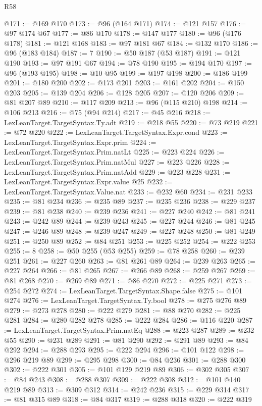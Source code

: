 \begin{lexlean}{R58}
\begin{coremodule}
@171 := @169 @170
@173 := @96 (@164 @171)
@174 := @121 @157
@176 := @97 @174 @67
@177 := @86 @170
@178 := @147 @177
@180 := @96 (@176 @178)
@181 := @121 @168
@183 := @97 @181 @67
@184 := @132 @170
@186 := @96 (@183 @184)
@187 := 7
@190 := @50 @187 (@53 @187)
@191 := @121 @190
@193 := @97 @191 @67
@194 := @78 @190
@195 := @194 @170
@197 := @96 (@193 @195)
@198 := @10 @95
@199 := @197 @198
@200 := @186 @199
@201 := @180 @200
@202 := @173 @201
@203 := @161 @202
@204 := @150 @203
@205 := @139 @204
@206 := @128 @205
@207 := @120 @206
@209 := @81 @207 @89
@210 := @117 @209
@213 := @96 (@115 @210) @198
@214 := @106 @213
@216 := @75 (@94 @214)
@217 := @45 @216
@218 := LexLeanTarget.TargetSyntax.Ty.adt
@219 := @218 @55
@220 := @73 @219
@221 := @72 @220
@222 := LexLeanTarget.TargetSyntax.Expr.cond
@223 := LexLeanTarget.TargetSyntax.Expr.prim
@224 := LexLeanTarget.TargetSyntax.Prim.natLt
@225 := @223 @224
@226 := LexLeanTarget.TargetSyntax.Prim.natMul
@227 := @223 @226
@228 := LexLeanTarget.TargetSyntax.Prim.natAdd
@229 := @223 @228
@231 := LexLeanTarget.TargetSyntax.Expr.value @25
@232 := LexLeanTarget.TargetSyntax.Value.nat
@233 := @232 @60
@234 := @231 @233
@235 := @81 @234
@236 := @235 @89
@237 := @235 @236
@238 := @229 @237
@239 := @81 @238
@240 := @239 @236
@241 := @227 @240
@242 := @81 @241
@243 := @242 @89
@244 := @239 @243
@245 := @227 @244
@246 := @81 @245
@247 := @246 @89
@248 := @239 @247
@249 := @227 @248
@250 := @81 @249
@251 := @250 @89
@252 := @84 @251
@253 := @225 @252
@254 := @222 @253
@255 := 8
@258 := @50 @255 (@53 @255)
@259 := @78 @258
@260 := @239 @251
@261 := @227 @260
@263 := @81 @261 @89
@264 := @239 @263
@265 := @227 @264
@266 := @81 @265
@267 := @266 @89
@268 := @259 @267
@269 := @81 @268
@270 := @269 @89
@271 := @86 @270
@272 := @225 @271
@273 := @254 @272
@274 := LexLeanTarget.TargetSyntax.Shape.false
@275 := @101 @274
@276 := LexLeanTarget.TargetSyntax.Ty.bool
@278 := @275 @276 @89
@279 := @273 @278
@280 := @222 @279
@281 := @88 @270
@282 := @225 @281
@284 := @280 @282 @278
@285 := @222 @284
@286 := @116 @220
@287 := LexLeanTarget.TargetSyntax.Prim.natEq
@288 := @223 @287
@289 := @232 @55
@290 := @231 @289
@291 := @81 @290
@292 := @291 @89
@293 := @84 @292
@294 := @288 @293
@295 := @222 @294
@296 := @101 @122
@298 := @296 @219 @89
@299 := @295 @298
@300 := @84 @236
@301 := @288 @300
@302 := @222 @301
@305 := @101 @129 @219 @89
@306 := @302 @305
@307 := @84 @243
@308 := @288 @307
@309 := @222 @308
@312 := @101 @140 @219 @89
@313 := @309 @312
@314 := @242 @236
@315 := @229 @314
@317 := @81 @315 @89
@318 := @84 @317
@319 := @288 @318
@320 := @222 @319

\end{coremodule}
\end{lexlean}
